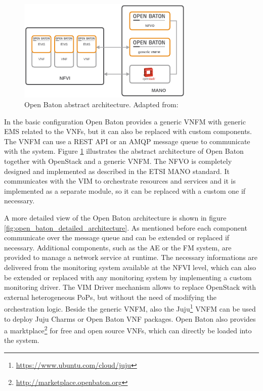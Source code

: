 \begin{figure}[H]
    \centering
    \includegraphics[width=0.75\textwidth]{resources/images/open_baton_simple_architecture.png}
    \caption[Open Baton abstract architecture]{Open Baton abstract architecture. Adapted from: \autocite{openBatonDoc}}
    \label{fig:open_baton_abstract_architecture}
\end{figure}

In the basic configuration Open Baton provides a generic \ac{VNFM} with generic \ac{EMS} related to the \acp{VNF}, but it can also be replaced with custom components.
The \ac{VNFM} can use a \ac{REST} \ac{API} or an \ac{AMQP} message queue to communicate with the system.
Figure \ref{fig:open_baton_abstract_architecture} illustrates the abstract architecture of Open Baton together with OpenStack and a generic \ac{VNFM}.
The \ac{NFVO} is completely designed and implemented as described in the \ac{ETSI} \ac{MANO} standard.\autocite{openBatonDoc}
It communicates with the \ac{VIM} to orchestrate resources and services and it is implemented as a separate module, so it can be replaced with a custom one if necessary.

A more detailed view of the Open Baton architecture is shown in figure \ref{fig:open_baton_detailed_architecture}.
As mentioned before each component communicate over the message queue and can be extended or replaced if necessary.
Additional components, such as the \ac{AE} or the \ac{FM} system, are provided to manage a network service at runtime.\autocite{openBatonDoc}
The necessary informations are delivered from the monitoring system available at the \ac{NFVI} level, which can also be extended or replaced with any monitoring system by implementing a custom monitoring driver.\autocite{openBatonDoc}
The \ac{VIM} Driver mechanism allows to replace OpenStack with external heterogeneous \acp{PoP}, but without the need of modifying the orchestration logic.\autocite{openBatonDoc}
Beside the generic \ac{VNFM}, also the Juju\footnote{\url{https://www.ubuntu.com/cloud/juju}} \ac{VNFM} can be used to deploy Juju Charms or Open Baton \ac{VNF} packages.
Open Baton also provides a marktplace\footnote{\url{http://marketplace.openbaton.org}} for free and open source \acp{VNF}, which can directly be loaded into the system.

